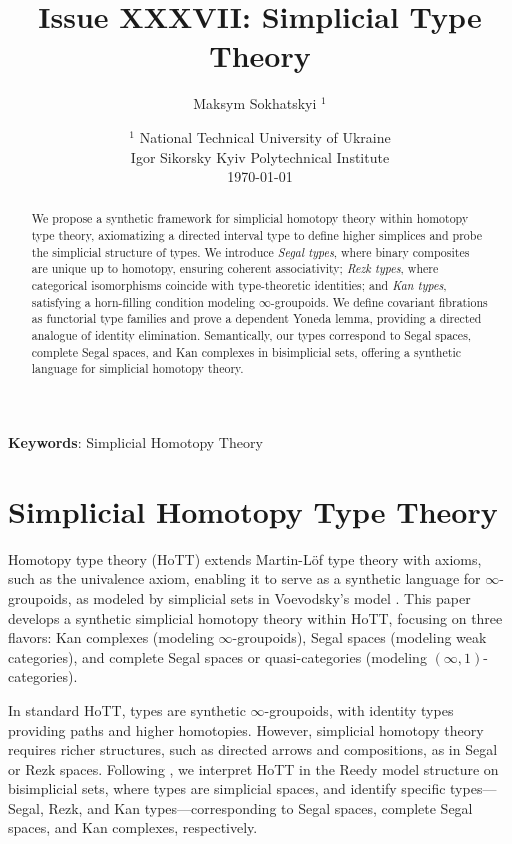 \documentclass{article}
\begin{document}
\title{Issue XXXVII: Simplicial Type Theory}
\author{Maksym Sokhatskyi $^1$}
\date{ $^1$ National Technical University of Ukraine \\
       \small Igor Sikorsky Kyiv Polytechnical Institute \\
       \today }

\maketitle

\begin{abstract}
We propose a synthetic framework for simplicial homotopy theory within
homotopy type theory, axiomatizing a directed interval type to define
higher simplices and probe the simplicial structure of types.
We introduce \emph{Segal types}, where binary composites are
unique up to homotopy, ensuring coherent associativity; \emph{Rezk types},
where categorical isomorphisms coincide with type-theoretic identities;
and \emph{Kan types}, satisfying a horn-filling condition modeling $\infty$-groupoids.
We define covariant fibrations as functorial type families and prove a dependent
Yoneda lemma, providing a directed analogue of identity elimination.
Semantically, our types correspond to Segal spaces, complete Segal spaces,
and Kan complexes in bisimplicial sets, offering a synthetic language for
simplicial homotopy theory.
\end{abstract}

{\bf Keywords}: Simplicial Homotopy Theory


\ifincludeTOC
  \tableofcontents
\else
\fi

\newpage
\section{Simplicial Homotopy Type Theory}

Homotopy type theory (HoTT) \cite{Uni13} extends Martin-L\"of type theory with axioms, such as the univalence axiom, enabling it to serve as a synthetic language for $\infty$-groupoids, as modeled by simplicial sets in Voevodsky’s model \cite{KL12}. This paper develops a synthetic simplicial homotopy theory within HoTT, focusing on three flavors: Kan complexes (modeling $\infty$-groupoids), Segal spaces (modeling weak categories), and complete Segal spaces or quasi-categories (modeling $(\infty,1)$-categories).

In standard HoTT, types are synthetic $\infty$-groupoids, with identity types providing paths and higher homotopies. However, simplicial homotopy theory requires richer structures, such as directed arrows and compositions, as in Segal or Rezk spaces. Following \cite{Shu15}, we interpret HoTT in the Reedy model structure on bisimplicial sets, where types are simplicial spaces, and identify specific types—Segal, Rezk, and Kan types—corresponding to Segal spaces, complete Segal spaces, and Kan complexes, respectively.
\end{document}
